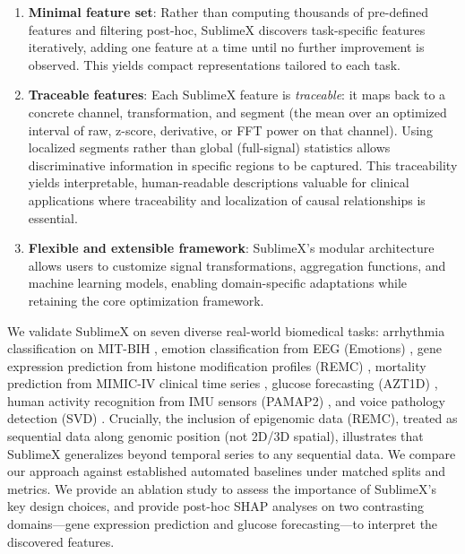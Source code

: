 \documentclass[times, review, 10pt]{elsarticle}
\begin{document}
\begin{enumerate}
\item \textbf{Minimal feature set}: Rather than computing thousands of pre-defined features and
filtering post-hoc, SublimeX discovers task-specific features iteratively, adding one feature
at a time until no further improvement is observed. This yields compact representations tailored to each task.

\item \textbf{Traceable features}: Each SublimeX feature is \emph{traceable}: it
maps back to a concrete channel, transformation, and segment (the mean over an
optimized interval of raw, z-score, derivative, or FFT power on that channel).
Using localized segments rather than global (full-signal) statistics allows
discriminative information in specific regions to be captured. This traceability yields interpretable, human-readable
descriptions valuable for clinical applications where traceability and
localization of causal relationships is essential.

\item \textbf{Flexible and extensible framework}: SublimeX's modular architecture allows users
to customize signal transformations, aggregation functions, and machine learning models,
enabling domain-specific adaptations while retaining the core optimization framework.
\end{enumerate}

We validate SublimeX on seven diverse real-world biomedical
tasks: arrhythmia classification on MIT-BIH \cite{MoodyMark1992,Goldberger2000}, emotion
classification from EEG (Emotions) \cite{bird2018study}, gene expression prediction from
histone modification profiles (REMC) \cite{Roadmap2015}, mortality prediction from MIMIC-IV
clinical time series \cite{Johnson2023MIMICIV}, glucose forecasting (AZT1D)
\cite{khamesian2025azt1d}, human activity recognition from IMU sensors (PAMAP2)
\cite{Reiss2012PAMAP2}, and voice pathology detection (SVD) \cite{svd_database}. Crucially,
the inclusion of epigenomic data (REMC), treated as sequential data along genomic position
(not 2D/3D spatial), illustrates that SublimeX generalizes beyond temporal series to any
sequential data. 
We compare our approach against established automated baselines under matched splits and metrics.
We provide an ablation study to assess the
importance of SublimeX's key design choices, and provide
post-hoc SHAP analyses on two contrasting domains---gene
expression prediction and glucose forecasting---to
interpret the discovered features.
\end{document}
